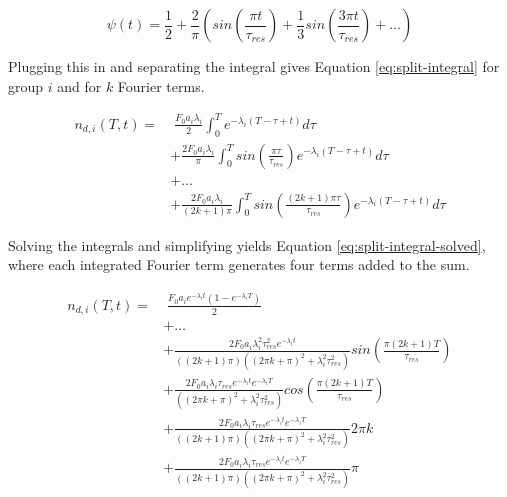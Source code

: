 \begin{equation}
    \psi(t) = \frac{1}{2} + \frac{2}{\pi} \left(sin \left(\frac{\pi t}{\tau_{res}} \right) + \frac{1}{3} sin \left(\frac{3 \pi t}{\tau_{res}} \right) + \dots  \right)
    \label{eq:pos-square}
\end{equation}

Plugging this in and separating the integral gives Equation \eqref{eq:split-integral} for group $i$ and for $k$ Fourier terms.

\begin{equation}
\begin{split}
    n_{d, i}(T, t) =& \; \frac{F_0 a_i \lambda_i}{2} \int_{0}^{T} e^{-\lambda_i \left( T-\tau + t \right)} d\tau\\
    & + \frac{2 F_0 a_i \lambda_i}{\pi} \int_{0}^{T} sin \left( \frac{\pi \tau}{\tau_{res}}  \right) e^{-\lambda_i \left( T-\tau + t \right)} d\tau\\
    & + \dots\\
    & + \frac{2 F_0 a_i \lambda_i}{(2k+1) \pi} \int_{0}^{T} sin \left( \frac{(2k+1) \pi \tau}{\tau_{res}}  \right) e^{-\lambda_i \left( T-\tau + t \right)} d\tau
    \label{eq:split-integral}
\end{split}
\end{equation}

Solving the integrals and simplifying yields Equation \eqref{eq:split-integral-solved}, where each integrated Fourier term generates four terms added to the sum.

\begin{equation}
\begin{split}
    n_{d, i}(T, t) =& \; \frac{F_0 a_i e^{-\lambda_i t} \left( 1 - e^{-\lambda_i T} \right)}{2}\\
    & + \dots\\
    & + \frac{2 F_0 a_i \lambda_i^2 \tau_{res}^2 e^{-\lambda_i t} }{\left( (2k+1) \pi \right) \left( (2 \pi k + \pi)^2 + \lambda_i^2 \tau_{res}^2 \right)} sin\left( \frac{\pi (2k+1) T}{\tau_{res}} \right)\\
    & + \frac{2 F_0 a_i \lambda_i \tau_{res} e^{-\lambda_i t} e^{-\lambda_i T}}{\left( (2 \pi k + \pi)^2 + \lambda_i^2 \tau_{res}^2 \right)} cos\left( \frac{\pi (2k+1) T}{\tau_{res}} \right)  \\
    & + \frac{2 F_0 a_i \lambda_i \tau_{res} e^{-\lambda_i t} e^{-\lambda_i T}}{\left( (2k+1) \pi \right) \left( (2 \pi k + \pi)^2 + \lambda_i^2 \tau_{res}^2 \right)} 2 \pi k  \\
    & + \frac{2 F_0 a_i \lambda_i \tau_{res} e^{-\lambda_i t} e^{-\lambda_i T}}{\left( (2k+1) \pi \right) \left( (2 \pi k + \pi)^2 + \lambda_i^2 \tau_{res}^2 \right)} \pi  \\
    \label{eq:split-integral-solved}
\end{split}
\end{equation}


